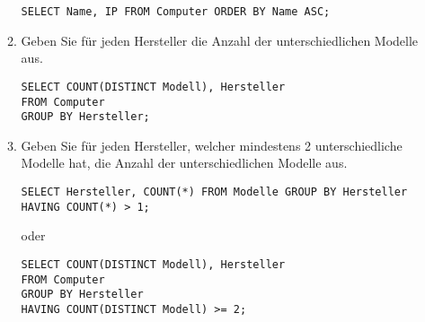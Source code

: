\documentclass{bschlangaul-aufgabe}
\begin{document}
\begin{enumerate}
\begin{enumerate}
\begin{bAntwort}
\begin{verbatim}
SELECT Name, IP FROM Computer ORDER BY Name ASC;
\end{verbatim}
\end{bAntwort}


\item Geben Sie für jeden Hersteller die Anzahl der unterschiedlichen
Modelle aus.

\begin{bAntwort}
\begin{verbatim}
SELECT COUNT(DISTINCT Modell), Hersteller
FROM Computer
GROUP BY Hersteller;
\end{verbatim}
\end{bAntwort}


\item Geben Sie für jeden Hersteller, welcher mindestens 2
unterschiedliche Modelle hat, die Anzahl der unterschiedlichen Modelle
aus.

\begin{bAntwort}
\begin{verbatim}
SELECT Hersteller, COUNT(*) FROM Modelle GROUP BY Hersteller HAVING COUNT(*) > 1;
\end{verbatim}
\end{bAntwort}

oder

\begin{bAntwort}
\begin{verbatim}
SELECT COUNT(DISTINCT Modell), Hersteller
FROM Computer
GROUP BY Hersteller
HAVING COUNT(DISTINCT Modell) >= 2;
\end{verbatim}
\end{bAntwort}
\end{enumerate}
\end{enumerate}
\end{document}
